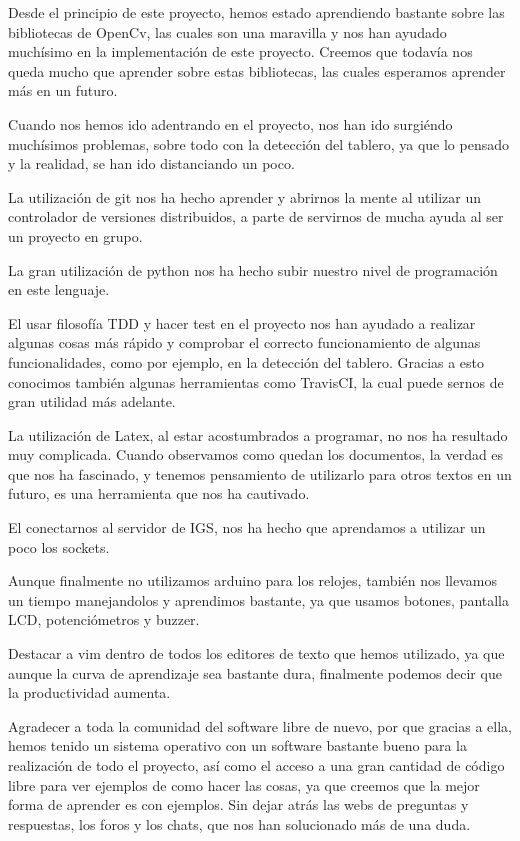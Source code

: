 \documentclass[12pt,a4papert,woside,openright,titlepage,final]{book}
\begin{document}
Desde el principio de este proyecto, hemos estado aprendiendo bastante sobre las
bibliotecas de OpenCv, las cuales son una maravilla y nos han ayudado muchísimo en
la implementación de este proyecto. Creemos que todavía nos queda mucho que
aprender sobre estas bibliotecas, las cuales esperamos aprender más en un futuro. 

Cuando nos hemos ido adentrando en el proyecto, nos han ido surgiéndo muchísimos
problemas, sobre todo con la detección del tablero, ya que lo pensado y la
realidad, se han ido distanciando un poco. 

La utilización de git nos ha hecho aprender y abrirnos la mente al utilizar un
controlador de versiones distribuidos, a parte de servirnos de mucha ayuda al
ser un proyecto en grupo. 

La gran utilización de python nos ha hecho subir nuestro nivel de programación
en este lenguaje.

El usar filosofía TDD y hacer test en el proyecto nos han ayudado a realizar
algunas cosas más rápido y comprobar el correcto funcionamiento de algunas
funcionalidades, como por ejemplo, en la detección del tablero. Gracias a esto
conocimos también algunas herramientas como TravisCI, la cual puede sernos de
gran utilidad más adelante. 

La utilización de Latex, al estar acostumbrados a programar, no nos ha resultado
muy complicada. Cuando observamos como quedan los documentos, la verdad es que
nos ha fascinado, y tenemos pensamiento de utilizarlo para otros textos en un
futuro, es una herramienta que nos ha cautivado.

El conectarnos al servidor de IGS, nos ha hecho que aprendamos a utilizar un
poco los sockets.

Aunque finalmente no utilizamos arduino para los relojes, también nos llevamos
un tiempo manejandolos y aprendimos bastante, ya que usamos botones, pantalla
LCD, potenciómetros y buzzer.

Destacar a vim dentro de todos los editores de texto que hemos utilizado, ya que
aunque la curva de aprendizaje sea bastante dura, finalmente podemos decir que
la productividad aumenta. 

Agradecer a toda la comunidad del software libre de nuevo, por que gracias a
ella, hemos tenido un sistema operativo con un software bastante bueno para la
realización de todo el proyecto, así como el acceso a una gran cantidad de
código libre para ver ejemplos de como hacer las cosas, ya que creemos que la
mejor forma de aprender es con ejemplos. Sin dejar atrás las webs de preguntas y
respuestas, los foros y los chats, que nos han solucionado más de una duda. 
\end{document}
